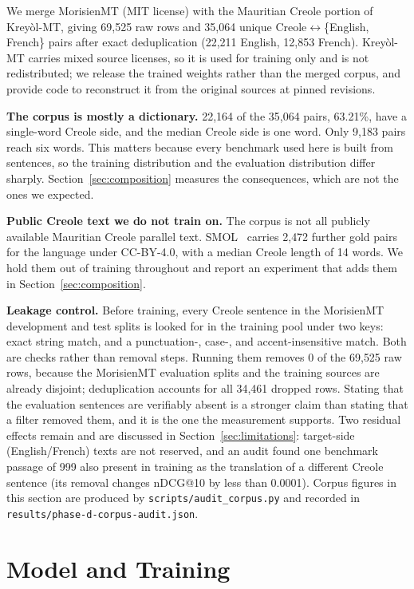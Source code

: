 \documentclass[11pt]{article}
\begin{document}
We merge MorisienMT (MIT license) with the Mauritian Creole portion of Kreyòl-MT, giving 69{,}525 raw
rows and 35{,}064 unique Creole$\leftrightarrow$\{English, French\} pairs after exact deduplication
(22{,}211 English, 12{,}853 French). Kreyòl-MT carries mixed source licenses, so it is used for
training only and is not redistributed; we release the trained weights rather than the merged corpus,
and provide code to reconstruct it from the original sources at pinned revisions.

\textbf{The corpus is mostly a dictionary.} 22{,}164 of the 35{,}064 pairs, 63.21\%, have a
single-word Creole side, and the median Creole side is one word. Only 9{,}183 pairs reach six words.
This matters because every benchmark used here is built from sentences, so the training distribution
and the evaluation distribution differ sharply. Section~\ref{sec:composition} measures the
consequences, which are not the ones we expected.

\textbf{Public Creole text we do not train on.} The corpus is not all publicly available Mauritian
Creole parallel text. SMOL~\citep{caswell2025smol} carries 2{,}472 further gold pairs for the
language under CC-BY-4.0, with a median Creole length of 14 words. We hold them out of training
throughout and report an experiment that adds them in Section~\ref{sec:composition}.

\textbf{Leakage control.} Before training, every Creole sentence in the MorisienMT development and
test splits is looked for in the training pool under two keys: exact string match, and a
punctuation-, case-, and accent-insensitive match. Both are checks rather than removal steps. Running
them removes 0 of the 69{,}525 raw rows, because the MorisienMT evaluation splits and the training
sources are already disjoint; deduplication accounts for all 34{,}461 dropped rows. Stating that the
evaluation sentences are verifiably absent is a stronger claim than stating that a filter removed
them, and it is the one the measurement supports. Two residual effects remain and are discussed in
Section~\ref{sec:limitations}: target-side (English/French) texts are not reserved, and an audit
found one benchmark passage of 999 also present in training as the translation of a different Creole
sentence (its removal changes nDCG@10 by less than 0.0001). Corpus figures in this section are
produced by \texttt{scripts/audit\_corpus.py} and recorded in
\texttt{results/phase-d-corpus-audit.json}.

\section{Model and Training}
\label{sec:training}
\end{document}
